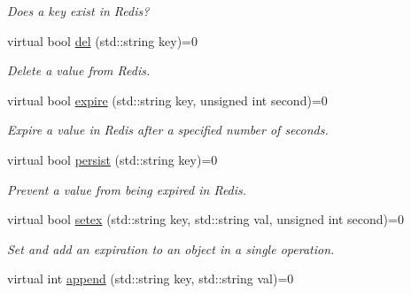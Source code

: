 \begin{DoxyCompactItemize}
\begin{DoxyCompactList}\small\item\em Does a key exist in Redis? \end{DoxyCompactList}\item 
\hypertarget{classRedisInterface_a320ec4f76fd83d767dc476a6ca330957}{virtual bool \hyperlink{classRedisInterface_a320ec4f76fd83d767dc476a6ca330957}{del} (std\-::string key)=0}\label{classRedisInterface_a320ec4f76fd83d767dc476a6ca330957}

\begin{DoxyCompactList}\small\item\em Delete a value from Redis. \end{DoxyCompactList}\item 
\hypertarget{classRedisInterface_a1bccb873c675701ce5f9c828067ba37f}{virtual bool \hyperlink{classRedisInterface_a1bccb873c675701ce5f9c828067ba37f}{expire} (std\-::string key, unsigned int second)=0}\label{classRedisInterface_a1bccb873c675701ce5f9c828067ba37f}

\begin{DoxyCompactList}\small\item\em Expire a value in Redis after a specified number of seconds. \end{DoxyCompactList}\item 
\hypertarget{classRedisInterface_ac2eaaa5dc9647ac1663e967deea12431}{virtual bool \hyperlink{classRedisInterface_ac2eaaa5dc9647ac1663e967deea12431}{persist} (std\-::string key)=0}\label{classRedisInterface_ac2eaaa5dc9647ac1663e967deea12431}

\begin{DoxyCompactList}\small\item\em Prevent a value from being expired in Redis. \end{DoxyCompactList}\item 
\hypertarget{classRedisInterface_abded05a0334cf85620cd1b0662466e42}{virtual bool \hyperlink{classRedisInterface_abded05a0334cf85620cd1b0662466e42}{setex} (std\-::string key, std\-::string val, unsigned int second)=0}\label{classRedisInterface_abded05a0334cf85620cd1b0662466e42}

\begin{DoxyCompactList}\small\item\em Set and add an expiration to an object in a single operation. \end{DoxyCompactList}\item 
\hypertarget{classRedisInterface_a0d01f532e140ea89b6ff4918654e8749}{virtual int \hyperlink{classRedisInterface_a0d01f532e140ea89b6ff4918654e8749}{append} (std\-::string key, std\-::string val)=0}\label{classRedisInterface_a0d01f532e140ea89b6ff4918654e8749}


\end{DoxyCompactItemize}
